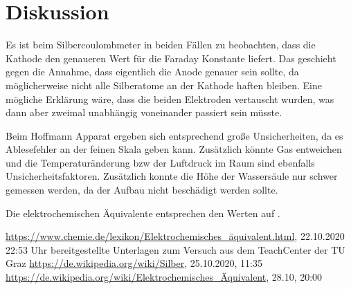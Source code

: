 \documentclass{article}
\begin{document}
\section{Diskussion}

Es ist beim Silbercoulombmeter in beiden Fällen zu beobachten, dass die Kathode den genaueren Wert für die Faraday Konstante liefert. Das geschieht gegen die Annahme, dass eigentlich die Anode genauer sein sollte, da möglicherweise nicht alle Silberatome an der Kathode haften bleiben. Eine mögliche Erklärung wäre, dass die beiden Elektroden vertauscht wurden, was dann aber zweimal unabhängig voneinander passiert sein müsste.

Beim Hoffmann Apparat ergeben sich entsprechend große Unsicherheiten, da es Ablesefehler an der feinen Skala geben kann. Zusätzlich könnte Gas entweichen und die Temperaturänderung bzw der Luftdruck im Raum sind ebenfalls Unsicherheitsfaktoren. Zusätzlich konnte die Höhe der Wassersäule nur schwer gemessen werden, da der Aufbau nicht beschädigt werden sollte.


Die elektrochemischen Äquivalente entsprechen den Werten auf \cite{equiv}.





%

%


%


\begin{thebibliography}{9}
 \url{https://www.chemie.de/lexikon/Elektrochemisches_äquivalent.html}, 22.10.2020 22:53 Uhr
 bereitgestellte Unterlagen zum Versuch aus dem TeachCenter der TU Graz
 \url{https://de.wikipedia.org/wiki/Silber}, 25.10.2020, 11:35
 \url{https://de.wikipedia.org/wiki/Elektrochemisches_Äquivalent}, 28.10, 20:00
\end{thebibliography}
\end{document}
